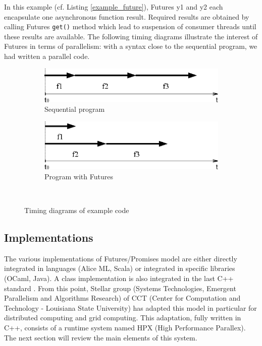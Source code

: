 \documentclass{llncs}
\begin{document}
In this example (cf. Listing \ref{example_future}), Futures y1 and y2 each
encapsulate one asynchronous function result. Required results are obtained by
calling Futures \texttt{get()} method which lead to suspension of consumer
threads until these results are available. The following timing diagrams
illustrate the interest of Futures in terms of parallelism: with a syntax close
to the sequential program, we had written a parallel code.

\begin{figure}[h]
      \begin{subfigure}[b]{0.5\textwidth}
	      \centering
	      \includegraphics[scale=0.4]{Images/Im2.png}
	      \caption{Sequential program}
	      
      \end{subfigure}
      \begin{subfigure}[b]{0.5\textwidth}
	      \centering
	      \includegraphics[scale=0.4]{Images/Im3.png}
	      \caption{Program with Futures}
      \end{subfigure}\\
      
      \caption{Timing diagrams of example code}
      \label{chronofuture}
\end{figure}

\subsection{Implementations}
The various implementations of Futures/Promises model are either directly
integrated in languages (Alice ML, Scala) or integrated in specific libraries
(OCaml, Java). A class implementation is also integrated in the last C++
standard \cite{Futuresc++}. From this point, Stellar group (Systems
Technologies, Emergent Parallelism and Algorithms Research) of CCT (Center for
Computation and Technology - Louisiana State University) has adapted this model
in particular for distributed computing and grid computing. This adaptation,
fully written in C++, consists of a runtime system named HPX (High Performance
Parallex). The next section will review the main elements of this system.   
\end{document}

